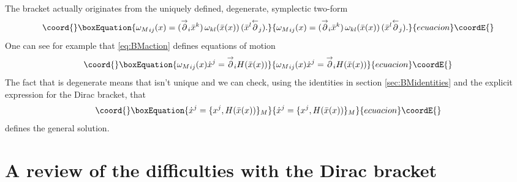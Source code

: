 \documentclass[a4paper,12pt]{article}
\theoremstyle{definition}
\theoremstyle{remark}
\numberwithin{equation}{section}
\providecommand{\om}{\omega}
\providecommand{\bx}{\bar{x}}
\providecommand{\dx}{\dot{x}}
\providecommand{\pl}{\overset{\leftarrow}{\partial}}
\providecommand{\pr}{\overset{\rightarrow}{\partial}}
\begin{document}
The bracket \coordHE{} actually originates from the uniquely
defined, degenerate, symplectic two-form
\begin{equation}\coord{}\boxEquation{\label{eq:omMform}
{\om_M}_{ij}(x)=(\pr_{i}\bx^k) \,\om_{kl}(\bx(x))\,
(\bx^l\pl_{j}).
}{{\om_M}_{ij}(x)=(\pr_{i}\bx^k) \,\om_{kl}(\bx(x))\,
(\bx^l\pl_{j}).
}{ecuacion}\coordE{}\end{equation}
One can see for example that \eqref{eq:BMaction} defines equations
of motion
\begin{equation}\coord{}\boxEquation{
{\om_M}_{ij}(x)\dx^j=\pr_i H(\bx(x))
}{
{\om_M}_{ij}(x)\dx^j=\pr_i H(\bx(x))
}{ecuacion}\coordE{}\end{equation}
The fact that \myHighlight{${\om_M}_{ij}$}\coordHE{} is degenerate means that \myHighlight{$\dx^j$}\coordHE{}
isn't unique and we can check, using the identities in section
\ref{sec:BMidentities} and the explicit expression for the Dirac
bracket, that
\begin{equation}\coord{}\boxEquation{
\dx^j=\{x^j,H(\bx(x))\}_M
}{
\dx^j=\{x^j,H(\bx(x))\}_M
}{ecuacion}\coordE{}\end{equation}
defines the general solution.


\section{A review of the difficulties with the Dirac bracket}
\label{sec:Diracbracket}
\end{document}
